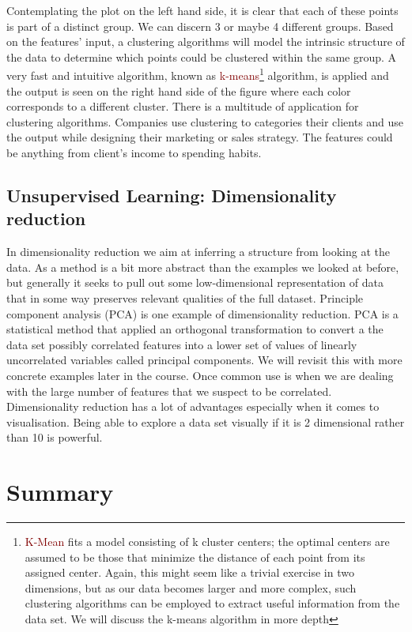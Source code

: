 \documentclass{tufte-handout}
\newcommand{\hlred}[1]{\textcolor{Maroon}{#1}}%
\begin{document}
Contemplating the plot on the left hand side, it is clear that each of these points is part of a distinct group. We can discern 3 or maybe 4 different groups. Based on the features' input, a clustering algorithms will model the intrinsic structure of the data to determine which points could be clustered within the same group. A very fast and intuitive algorithm, known as  \hlred{k-means}\footnote{\hlred{K-Mean} fits a model consisting of k cluster centers; the optimal centers are assumed to be those that minimize the distance of each point from its assigned center. Again, this might seem like a trivial exercise in two dimensions, but as our data becomes larger and more complex, such clustering algorithms can be employed to extract useful information from the data set.
We will discuss the k-means algorithm in more depth} algorithm, is applied and the output is seen on the right hand side of the figure where each color corresponds to a different cluster.
There is a multitude of application for clustering algorithms. Companies use clustering to categories their clients and use the output while designing their marketing or sales strategy. The features could be anything from client's income to spending habits. 

\subsection{Unsupervised Learning: Dimensionality reduction }
In dimensionality reduction we aim at inferring a structure from looking at the data. As a method is a bit more abstract than the examples we looked at before, but generally it seeks to pull out some low-dimensional representation of data that in some way preserves relevant qualities of the full dataset. Principle component analysis (PCA) is one example of dimensionality reduction. PCA is a statistical method that applied an orthogonal transformation to convert a the data set possibly correlated features into a lower set of values of linearly uncorrelated variables called principal components. We will revisit this with more concrete examples later in the course. Once common use is when we are dealing with the large number of features that we suspect to be correlated. Dimensionality reduction has a lot of advantages especially when it comes to visualisation. Being able to explore a data set visually if it is 2 dimensional rather than 10 is powerful. 

\section{Summary}
\end{document}
